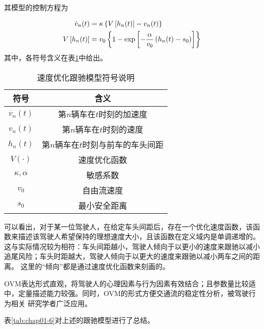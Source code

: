其模型的控制方程为

\begin{align}
  \dot{v}_n(t) &= \kappa \left\{ V \left[ h_n(t) \right] - v_n(t) \right\} \notag \\
  V \left[ h_n(t) \right] &= v_0 \left\{ 1 - \exp \left[ - \frac{\alpha}{v_0}\left(h_n(t)-s_0\right) \right] \right\}
  \label{eq:chap01-4}
\end{align}
其中，各符号含义在表\ref{tab:chap01-5}中给出。

\begin{table}
  \centering
  \caption{速度优化跟驰模型符号说明}
  \begin{tabular}{cc}
    \toprule
    符号          &  含义                         \\
    \midrule
    $\dot{v_n}(t)$    & 第$n$辆车在$t$时刻的加速度        \\
    $v_n(t)$          & 第$n$辆车在$t$时刻的速度         \\
    $h_n(t)$          & 第$n$辆车在$t$时刻与前车的车头间距  \\
    $V(\cdot)$        & 速度优化函数         \\
    $\kappa, \alpha$  & 敏感系数             \\
    $v_0$             & 自由流速度           \\
    $s_0$             & 最小安全距离        \\
    \bottomrule
  \end{tabular}
  \label{tab:chap01-5}
\end{table}

可以看出，对于某一位驾驶人，在给定车头间距后，存在一个优化速度函数，该函数来描述该驾驶人希望保持的理想速度大小，且该函数在定义域内是单调递增的。
这与实际情况较为相符：车头间距越小，驾驶人倾向于以更小的速度来跟驰以减小追尾风险；车头时距越大，驾驶人倾向于以更大的速度来跟驰以减小两车之间的距离。
这里的“倾向”都是通过速度优化函数来刻画的。

OVM表达形式直观，将驾驶人的心理因素与行为因素有效结合；且参数量比较适中，定量描述能力较强。同时，OVM的形式方便交通流的稳定性分析，被驾驶行为相关
研究学者广泛应用。

表\ref{tab:chap01-6}对上述的跟驰模型进行了总结。

